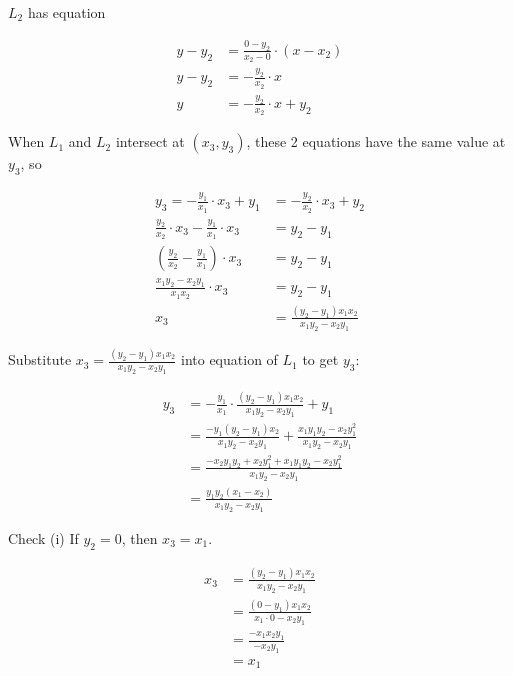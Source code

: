 \documentclass[9pt]{article}
\begin{document}
$L_2$ has equation

\begin{align*}
  y - y_2 &= \frac{0 - y_2}{x_2 - 0} \cdot (x - x_2) \\
  y - y_2 &= -\frac{y_2}{x_2} \cdot x \\
  y &= -\frac{y_2}{x_2} \cdot x + y_2
\end{align*}

When $L_1$ and $L_2$ intersect at $(x_3, y_3)$, these 2 equations have the same value at $y_3$, so

\begin{align*}
  y_3 = -\frac{y_1}{x_1} \cdot x_3 + y_1 &= -\frac{y_2}{x_2} \cdot x_3 + y_2 \\
  \frac{y_2}{x_2} \cdot x_3 - \frac{y_1}{x_1} \cdot x_3 &= y_2 - y_1 \\
  (\frac{y_2}{x_2} - \frac{y_1}{x_1}) \cdot x_3 &= y_2 - y_1 \\
  \frac{x_1 y_2 - x_2 y_1}{x_1 x_2} \cdot x_3  &= y_2 - y_1 \\
  x_3 &= \frac{(y_2 - y_1) x_1 x_2}{x_1 y_2 - x_2 y_1} \tag*{(Assuming $x_1 y_2 \neq x_2 y_1$)}
\end{align*}

Substitute $x_3 = \frac{(y_2 - y_1) x_1 x_2}{x_1 y_2 - x_2 y_1}$ into equation of $L_1$ to get $y_3$:

\begin{align*}
  y_3 &= -\frac{y_1}{x_1} \cdot \frac{(y_2 - y_1) x_1 x_2}{x_1 y_2 - x_2 y_1} + y_1 \\
      &= \frac{-y_1 (y_2 - y_1) x_2}{x_1 y_2 - x_2 y_1} + \frac{x_1 y_1 y_2 - x_2 y_1^2}{x_1 y_2 - x_2 y_1} \\
      &= \frac{-x_2 y_1 y_2 + x_2 y_1^2 + x_1 y_1 y_2 - x_2 y_1^2}{x_1 y_2 - x_2 y_1} \\
      &= \frac{y_1 y_2 (x_1 - x_2)}{x_1 y_2 - x_2 y_1}
\end{align*}

\begin{tcolorbox}
  Check (i) If $y_2 = 0$, then $x_3 = x_1$.
\end{tcolorbox}

\begin{align*}
  x_3 &= \frac{(y_2 - y_1) x_1 x_2}{x_1 y_2 - x_2 y_1} \\
      &= \frac{(0 - y_1) x_1 x_2}{x_1 \cdot 0 - x_2 y_1} \\
      &= \frac{- x_1 x_2 y_1}{- x_2 y_1} \\
      &= x_1
\end{align*}
\end{document}

